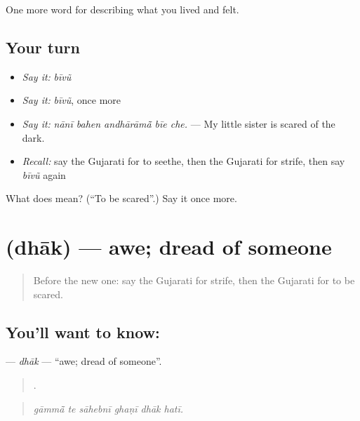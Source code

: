 \begin{grammarlens}[title={What you've built}]
One more word for describing what you lived and felt.
\end{grammarlens}

\subsection*{Your turn}
\begin{itemize}
\raggedright
  \item \emph{Say it:} \emph{bīvũ}
  \item \emph{Say it:} \emph{bīvũ}, once more
  \item \emph{Say it:} \emph{nānī bahen andhārāmā̃ bīe che.} — My little sister is scared of the dark.
  \item \emph{Recall:} say the Gujarati for to seethe, then the Gujarati for strife, then say \emph{bīvũ} again
\end{itemize}

\begin{tcolorbox}[breakable,colback=teal!4,colframe=teal!35!black,title={Before you move on}]
What does  mean? (\textquotedblleft{}To be scared\textquotedblright{}.) Say it once more.
\end{tcolorbox}
\section[\texorpdfstring{\gu{ધાક} (dhāk)}{ધાક (dhāk)}]{ (dhāk) — awe; dread of someone}

\label{lesson:GU-C453-dhak}



\begin{quote}
Before the new one: say the Gujarati for strife, then the Gujarati for to be scared.
\end{quote}

\subsection*{You'll want to know: }
\textbf{} — \emph{dhāk} — \textquotedblleft{}awe; dread of someone\textquotedblright{}.

\begin{quote}
     .
\end{quote}

\begin{quote}
\emph{gāmmā̃ te sāhebnī ghaṇī dhāk hatī.}
\end{quote}

